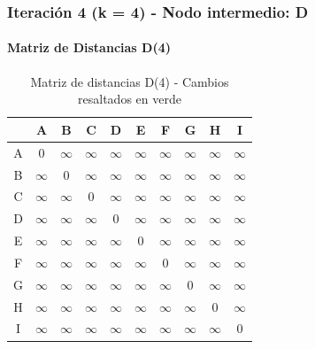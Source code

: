\documentclass[12pt]{article}
\begin{document}
\subsubsection{Iteración 4 (k = 4) - Nodo intermedio: D}
\paragraph{Matriz de Distancias D(4)}
\begin{table}[h!]
\centering
\begin{tabular}{|c|c|c|c|c|c|c|c|c|c|}
\hline
 & A & B & C & D & E & F & G & H & I \\\hline
A & 0 & $\infty$ & $\infty$ & $\infty$ & $\infty$ & $\infty$ & $\infty$ & $\infty$ & $\infty$ \\\hline
B & $\infty$ & 0 & $\infty$ & $\infty$ & $\infty$ & $\infty$ & $\infty$ & $\infty$ & $\infty$ \\\hline
C & $\infty$ & $\infty$ & 0 & $\infty$ & $\infty$ & $\infty$ & $\infty$ & $\infty$ & $\infty$ \\\hline
D & $\infty$ & $\infty$ & $\infty$ & 0 & $\infty$ & $\infty$ & $\infty$ & $\infty$ & $\infty$ \\\hline
E & $\infty$ & $\infty$ & $\infty$ & $\infty$ & 0 & $\infty$ & $\infty$ & $\infty$ & $\infty$ \\\hline
F & $\infty$ & $\infty$ & $\infty$ & $\infty$ & $\infty$ & 0 & $\infty$ & $\infty$ & $\infty$ \\\hline
G & $\infty$ & $\infty$ & $\infty$ & $\infty$ & $\infty$ & $\infty$ & 0 & $\infty$ & $\infty$ \\\hline
H & $\infty$ & $\infty$ & $\infty$ & $\infty$ & $\infty$ & $\infty$ & $\infty$ & 0 & $\infty$ \\\hline
I & $\infty$ & $\infty$ & $\infty$ & $\infty$ & $\infty$ & $\infty$ & $\infty$ & $\infty$ & 0 \\\hline
\end{tabular}
\caption{Matriz de distancias D(4) - Cambios resaltados en verde}
\end{table}
\end{document}
